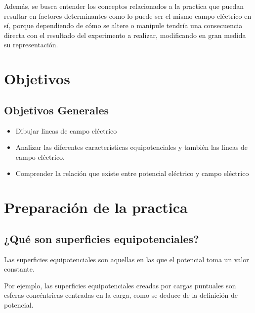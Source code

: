\documentclass[letterpaper, 12pt]{report}
\begin{document}
\vspace{.5cm}

Además, se busca entender los conceptos relacionados a la practica que puedan 
resultar en factores determinantes como lo puede ser el mismo campo eléctrico 
en sí, porque dependiendo de cómo se altere o manipule tendría una consecuencia 
directa con el resultado del experimento a realizar, modificando en gran 
medida su representación.

\newpage

\section{Objetivos}

\subsection{Objetivos Generales}

\begin{itemize}
	\item Dibujar lineas de campo eléctrico
	\item Analizar las diferentes características equipotenciales y también
	      las lineas de campo eléctrico.
	\item Comprender la relación que existe entre potencial eléctrico y
	      campo eléctrico
\end{itemize}

\newpage

\section{Preparación de la practica}

\subsection{¿Qué son superficies equipotenciales?}
Las superficies equipotenciales son aquellas en las que el potencial toma un
valor constante.

Por ejemplo, las superficies equipotenciales creadas por
cargas puntuales son esferas concéntricas centradas en la carga, como se
deduce de la definición de potencial.\hfill\break{}~\cite{blas_fernández}

\end{document}
